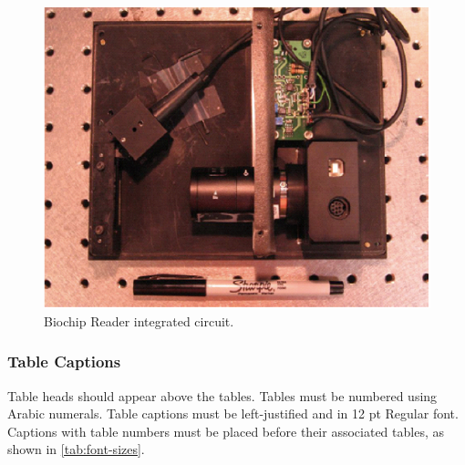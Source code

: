 \documentclass{siintec}
\begin{document}
\begin{figure}[ht]
    \centering
    \caption{Biochip Reader integrated circuit.}
    \label{fig:biochip}
        \vspace{0.5em}
    \includegraphics[width=0.7\linewidth]{biochip.png}
\end{figure}

\begin{graphic}[ht]
    \centering
    \caption{Diagram example created with TikZ.}
    \label{grph:tikz}
\end{graphic}

\subsubsection{Table Captions}
Table heads should appear above the tables. Tables must be numbered using Arabic numerals. Table captions must be left-justified and in 12 pt Regular font. Captions with table numbers must be placed before their associated tables, as shown in \autoref{tab:font-sizes}.
\end{document}
